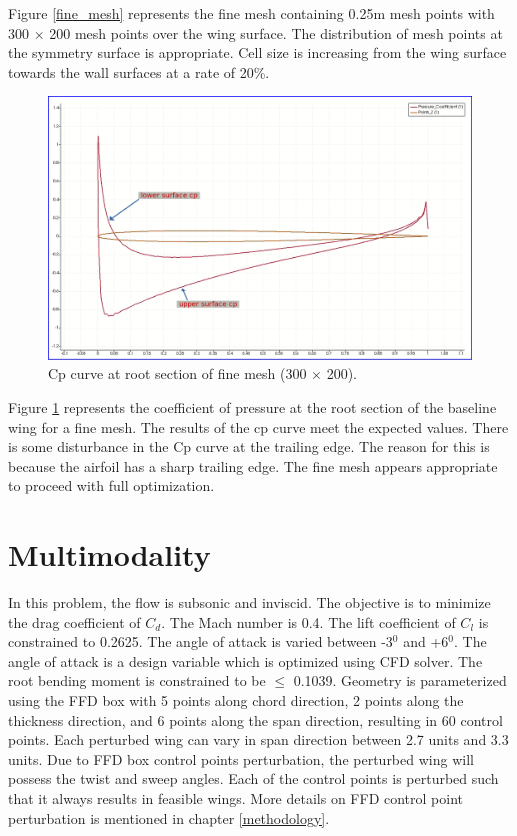 Figure \ref{fine_mesh} represents the fine mesh containing 0.25m mesh points with 300 $\times$ 200 mesh points over the wing surface. The distribution of mesh points at the symmetry surface is appropriate. Cell size is increasing from the wing surface towards the wall surfaces at a rate of 20\%.
\begin{figure}[!htbp]
    \centering
    \includegraphics[scale = 0.3]{figures/cp_curve.png}
    \caption{Cp curve at root section of fine mesh (300 $\times$ 200).}
    \label{cp curve}
\end{figure}

Figure \ref{cp curve} represents the coefficient of pressure at the root section of the baseline wing for a fine mesh. The results of the cp curve meet the expected values. There is some disturbance in the Cp curve at the trailing edge. The reason for this is because the airfoil has a sharp trailing edge. The fine mesh appears appropriate to proceed with full optimization.

\section{Multimodality}
In this problem, the flow is subsonic and inviscid. The objective is to minimize the drag coefficient of $C_d$. The Mach number is 0.4. The lift coefficient of $C_l$ is constrained to 0.2625. The angle of attack is varied between -3$^0$ and +6$^0$. The angle of attack is a design variable which is optimized using CFD solver. The root bending moment is constrained to be $\leq$ 0.1039. Geometry is parameterized using the FFD box with 5 points along chord direction, 2 points along the thickness direction, and 6 points along the span direction, resulting in 60 control points. Each perturbed wing can vary in span direction between 2.7 units and 3.3 units. Due to FFD box control points perturbation, the perturbed wing will possess the twist and sweep angles. Each of the control points is perturbed such that it always results in feasible wings. More details on FFD control point perturbation is mentioned in chapter \ref{methodology}.

